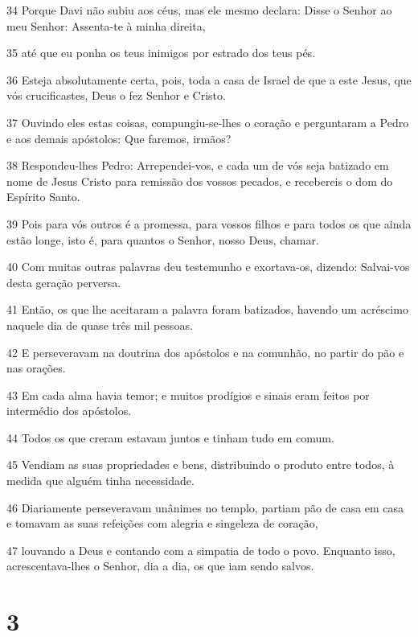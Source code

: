 \par 34 Porque Davi não subiu aos céus, mas ele mesmo declara: Disse o Senhor ao meu Senhor: Assenta-te à minha direita,
\par 35 até que eu ponha os teus inimigos por estrado dos teus pés.
\par 36 Esteja absolutamente certa, pois, toda a casa de Israel de que a este Jesus, que vós crucificastes, Deus o fez Senhor e Cristo.
\par 37 Ouvindo eles estas coisas, compungiu-se-lhes o coração e perguntaram a Pedro e aos demais apóstolos: Que faremos, irmãos?
\par 38 Respondeu-lhes Pedro: Arrependei-vos, e cada um de vós seja batizado em nome de Jesus Cristo para remissão dos vossos pecados, e recebereis o dom do Espírito Santo.
\par 39 Pois para vós outros é a promessa, para vossos filhos e para todos os que ainda estão longe, isto é, para quantos o Senhor, nosso Deus, chamar.
\par 40 Com muitas outras palavras deu testemunho e exortava-os, dizendo: Salvai-vos desta geração perversa.
\par 41 Então, os que lhe aceitaram a palavra foram batizados, havendo um acréscimo naquele dia de quase três mil pessoas.
\par 42 E perseveravam na doutrina dos apóstolos e na comunhão, no partir do pão e nas orações.
\par 43 Em cada alma havia temor; e muitos prodígios e sinais eram feitos por intermédio dos apóstolos.
\par 44 Todos os que creram estavam juntos e tinham tudo em comum.
\par 45 Vendiam as suas propriedades e bens, distribuindo o produto entre todos, à medida que alguém tinha necessidade.
\par 46 Diariamente perseveravam unânimes no templo, partiam pão de casa em casa e tomavam as suas refeições com alegria e singeleza de coração,
\par 47 louvando a Deus e contando com a simpatia de todo o povo. Enquanto isso, acrescentava-lhes o Senhor, dia a dia, os que iam sendo salvos.

\chapter{3}

